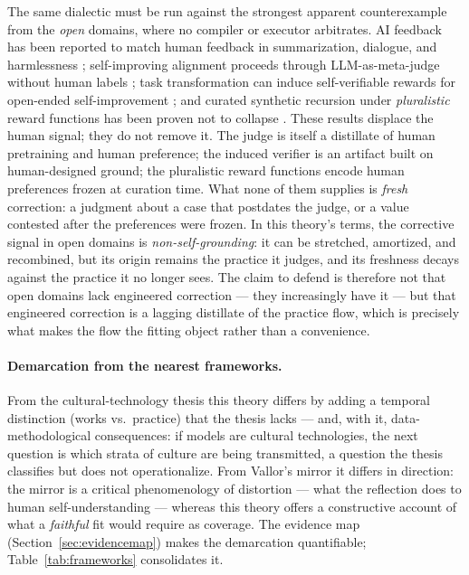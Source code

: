\documentclass[10pt]{article}
\begin{document}
The same dialectic must be run against the strongest apparent counterexample from the \emph{open} domains, where no compiler or executor arbitrates. AI feedback has been reported to match human feedback in summarization, dialogue, and harmlessness \cite{lee2023rlaif}; self-improving alignment proceeds through LLM-as-meta-judge without human labels \cite{wu2024metarewarding}; task transformation can induce self-verifiable rewards for open-ended self-improvement \cite{wang2026rlsvr}; and curated synthetic recursion under \emph{pluralistic} reward functions has been proven not to collapse \cite{falahati2026pluralistic}. These results displace the human signal; they do not remove it. The judge is itself a distillate of human pretraining and human preference; the induced verifier is an artifact built on human-designed ground; the pluralistic reward functions encode human preferences frozen at curation time. What none of them supplies is \emph{fresh} correction: a judgment about a case that postdates the judge, or a value contested after the preferences were frozen. In this theory's terms, the corrective signal in open domains is \emph{non-self-grounding}: it can be stretched, amortized, and recombined, but its origin remains the practice it judges, and its freshness decays against the practice it no longer sees. The claim to defend is therefore not that open domains lack engineered correction --- they increasingly have it --- but that engineered correction is a lagging distillate of the practice flow, which is precisely what makes the flow the fitting object rather than a convenience.

\paragraph{Demarcation from the nearest frameworks.}
From the cultural-technology thesis \cite{farrell2025cultural} this theory differs by adding a temporal distinction (works vs.\ practice) that the thesis lacks --- and, with it, data-methodological consequences: if models are cultural technologies, the next question is which strata of culture are being transmitted, a question the thesis classifies but does not operationalize. From Vallor's mirror \cite{vallor2024mirror} it differs in direction: the mirror is a critical phenomenology of distortion --- what the reflection does to human self-understanding --- whereas this theory offers a constructive account of what a \emph{faithful} fit would require as coverage. The evidence map (Section~\ref{sec:evidencemap}) makes the demarcation quantifiable; Table~\ref{tab:frameworks} consolidates it.
\end{document}
